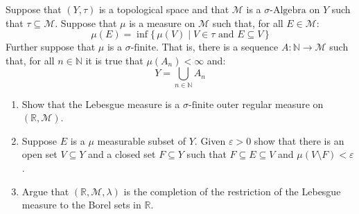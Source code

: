 \documentclass[crop=false,class=article]{standalone}                           %
\begin{document}
        \begin{problem}
            Suppose that $(Y,\tau)$ is a topological space and that
            $\mathcal{M}$ is a $\sigma\textrm{-Algebra}$ on $Y$ such that
            $\tau\subseteq\mathcal{M}$. Suppose that $\mu$ is a measure on
            $\mathcal{M}$ such that, for all $E\in\mathcal{M}$:
            \begin{equation}
                \mu(E)
                =\inf\{\,\mu(V)\;|\;V\in\tau\textrm{ and }E\subseteq{V}\,\}
            \end{equation}
            Further suppose that $\mu$ is a $\sigma\textrm{-finite}$. That is,
            there is a sequence $A:\mathbb{N}\rightarrow\mathcal{M}$ such that,
            for all $n\in\mathbb{N}$ it is true that $\mu(A_{n})<\infty$ and:
            \begin{equation}
                Y=\bigcup_{n\in\mathbb{N}}A_{n}
            \end{equation}
            \begin{enumerate}
                \item   Show that the Lebesgue measure is a
                        $\sigma\textrm{-finite}$ outer regular measure on
                        $(\mathbb{R},\mathcal{M})$.
                \item   Suppose $E$ is a $\mu$ measurable subset of $Y$. Given
                        $\varepsilon>0$ show that there is an open set
                        $V\subseteq{Y}$ and a closed set $F\subseteq{Y}$ such
                        that $F\subseteq{E}\subseteq{V}$ and
                        $\mu(V\setminus{F})<\varepsilon$.
                \item   Argue that $(\mathbb{R},\mathcal{M},\lambda)$ is the
                        completion of the restriction of the Lebesgue measure
                        to the Borel sets in $\mathbb{R}$.
            \end{enumerate}
        \end{problem}
\end{document}
